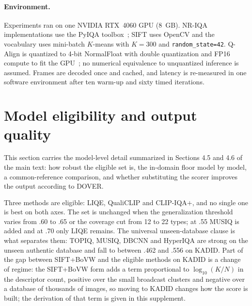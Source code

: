 \documentclass[sn-basic,Numbered]{sn-jnl}
\begin{document}
\paragraph{Environment.} Experiments ran on one NVIDIA RTX~4060 GPU (8~GB). NR-IQA
implementations use the PyIQA toolbox~\citep{chen2022pyiqa}; SIFT uses OpenCV and the
vocabulary uses mini-batch $K$-means with $K=300$ and \texttt{random\_state=42}. Q-Align is
quantized to 4-bit NormalFloat with double quantization and FP16 compute to fit the
GPU~\citep{dettmers2023qlora}; no numerical equivalence to unquantized inference is
assumed. Frames are decoded once and cached, and latency is re-measured in one software
environment after ten warm-up and sixty timed iterations.

\clearpage


\clearpage







\clearpage
\section*{Model eligibility and output quality}\label{sup:benchmark}

This section carries the model-level detail summarized in Sections 4.5 and 4.6 of the main
text: how robust the eligible set is, the in-domain floor model by model, a common-reference
comparison, and whether substituting the scorer improves the output according to DOVER.

Three methods are eligible: LIQE, QualiCLIP and CLIP-IQA$+$, and no single one is
best on both axes. The set is unchanged when the generalization threshold varies from .60
to .65 or the coverage cut from 12 to 22 types; at .55 MUSIQ is added and at .70 only LIQE
remains. The universal unseen-database clause is what separates them: TOPIQ,
MUSIQ, DBCNN and HyperIQA are strong on the unseen authentic database and fall to between
.462 and .556 on KADID. Part of the gap between SIFT+BoVW and the eligible methods on KADID is a change of regime: the SIFT+BoVW form adds a term proportional to $\log_{10}(K/N)$ in the descriptor count, positive over the small broadcast clusters and negative over a database of thousands of images, so moving to KADID changes how the score is built; the derivation of that term is given in this supplement.
\end{document}
